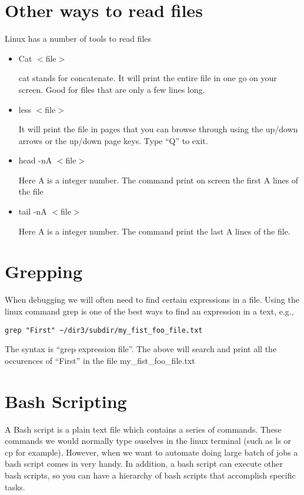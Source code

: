 \documentclass[aps,showpacs,prd,notitlepage,preprintnumbers,amsmath,amssymb,letterpaper]{revtex4}
\begin{document}
\section{Other ways to read files}

Linux has a number of tools to read files

\begin{itemize}

\item Cat $<$file$>$
  
  cat stands for concatenate. It will print the entire file in one go on your screen. Good for files
  that are only a few lines long. 

\item less $<$file$>$

  It will print the file in pages that you can browse through using the up/down arrows or the up/down
  page keys. Type ``Q'' to exit.

\item head -nA $<$file$>$

  Here A is a integer number. The command print on screen the first A lines of the file

\item tail -nA $<$file$>$

Here A is a integer number. The command print the last A lines of the file.

\end{itemize}

\section{Grepping}

When debugging we will often need to find certain expressions in a file. Using the linux command
grep is one of the best ways to find an expression in a text, e.g.,

\begin{verbatim}
grep "First" ~/dir3/subdir/my_fist_foo_file.txt
\end{verbatim}

The syntax is ``grep expression file''. The above will search and
print all the occurences of ``First'' in the file
my\_fist\_foo\_file.txt

\section{Bash Scripting}

A Bash script is a plain text file which contains a series of
commands. These commands we would normally type ouselves in the linux
terminal (such as ls or cp for example). However, when we want to
automate doing large batch of jobs a bash script comes in very
handy. In addition, a bash script can execute other bash scripts, so
you can have a hierarchy of bash scripts that accomplish specific
tasks.
\end{document}
